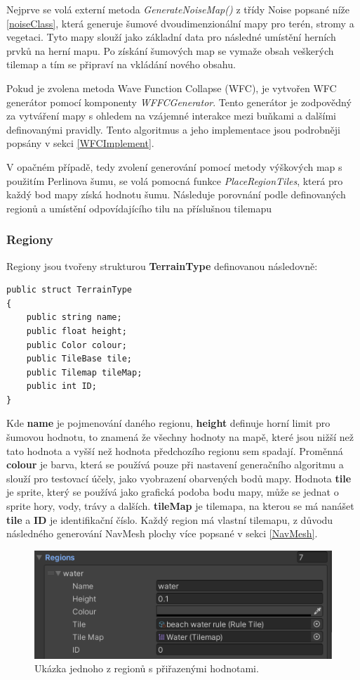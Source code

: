 Nejprve se volá externí metoda \textit{GenerateNoiseMap()} z třídy Noise popsané níže \ref{noiseClass}, která generuje šumové dvoudimenzionální mapy pro terén, stromy a vegetaci. Tyto mapy slouží jako základní data pro následné umístění herních prvků na herní mapu. Po získání šumových map se vymaže obsah veškerých tilemap a tím se připraví na vkládání nového obsahu.

Pokud je zvolena metoda Wave Function Collapse (WFC), je vytvořen WFC generátor pomocí komponenty \textit{WFFCGenerator}. Tento generátor je zodpovědný za vytváření mapy s ohledem na vzájemné interakce mezi buňkami a dalšími definovanými pravidly. Tento algoritmus a jeho implementace jsou podrobněji popsány v sekci \ref{WFCImplement}.

V opačném případě, tedy zvolení generování pomocí metody výškových map s použitím Perlinova šumu, se volá pomocná funkce \textit{PlaceRegionTiles}, která pro každý bod mapy získá hodnotu šumu. Následuje porovnání podle definovaných regionů a umístění odpovídajícího tilu na příslušnou tilemapu

\subsubsection{Regiony}
Regiony jsou tvořeny strukturou \textbf{TerrainType} definovanou následovně:
\begin{lstlisting}
public struct TerrainType
{
	public string name;
	public float height;
	public Color colour;
	public TileBase tile;
	public Tilemap tileMap;
	public int ID;
}
\end{lstlisting}
Kde \textbf{name} je pojmenování daného regionu, \textbf{height} definuje horní limit pro šumovou hodnotu, to znamená že všechny hodnoty na mapě, které jsou nižší než tato hodnota a vyšší než hodnota předchozího regionu sem spadají. Proměnná \textbf{colour} je barva, která se používá pouze při nastavení generačního algoritmu a slouží pro testovací účely, jako vyobrazení obarvených bodů mapy. Hodnota \textbf{tile} je sprite, který se používá jako grafická podoba bodu mapy, může se jednat o sprite hory, vody, trávy a dalších. \textbf{tileMap} je tilemapa, na kterou se má nanášet \textbf{tile} a \textbf{ID} je identifikační číslo. Každý region má vlastní tilemapu, z důvodu následného generování NavMesh plochy více popsané v sekci \ref{NavMesh}.

\begin{figure}[H]
	\centering
	\includegraphics[scale=1]{obrazky-figures/MapGeneratorRegions.png}
	\caption{Ukázka jednoho z regionů s přiřazenými hodnotami.}
	\label{fig:MapGeneratorRegions}
\end{figure}
 
